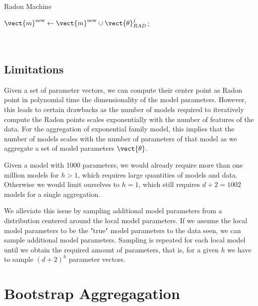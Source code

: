 \begin{algo}{Radon Machine}
\begin{algorithm}[H]
\begin{algorithmic}[1]
{{                $\vect{m}^{\text{new}}\leftarrow \vect{m}^{\text{new}} \cup \vect{\theta}_{RAD}^j$;  \\
            } 
            \ENDFOR
            }\\
            \\
            \ENDFOR
        \end{algorithmic}
    \end{algorithm}
\end{algo}

\subsection{Limitations}
Given a set of parameter vectors, we can compute their center point as Radon point in polynomial time \wrt the dimensionality of the model parameters.
However, this leads to certain drawbacks as the number of models required to iteratively compute the Radon points scales exponentially with the number of features of the data.
For the aggregation of exponential family model, this implies that the number of models scales with the number of parameters of that model as we aggregate a set of model parameters $\vect{\theta}$.

Given a model with 1000 parameters, we would already require more than one million models for $h > 1$, which requires large quantities of models and data.
Otherwise we would limit ourselves to $h=1$, which still requires $d+2 = 1002$ models for a single aggregation.

We alleviate this issue by sampling additional model parameters from a distribution centered around the local model parameters. 
If we assume the local model parameters to be the "true" model parameters \wrt to the data seen, we can sample additional model parameters.
Sampling is repeated for each local model until we obtain the required amount of parameters, that is, for a given $h$ we have to sample $(d+2)^h$ parameter vectors.


\section{Bootstrap Aggregagation}

